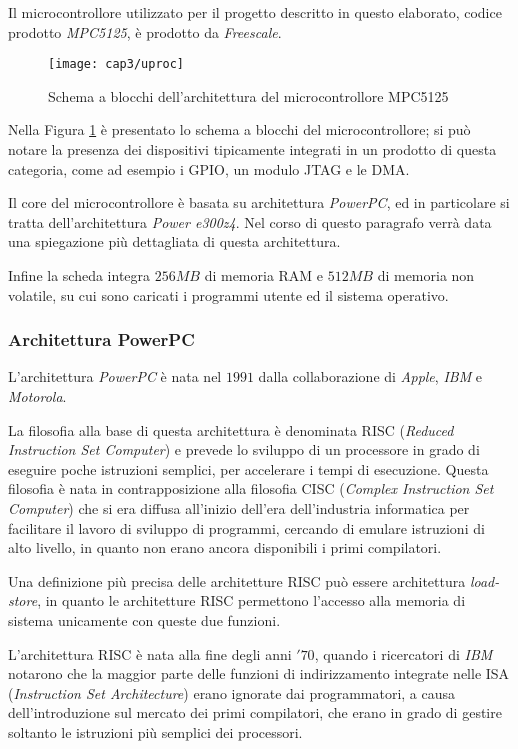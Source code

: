 Il microcontrollore utilizzato per il progetto descritto in questo elaborato, codice prodotto \textit{MPC5125}, è prodotto da \textit{Freescale}. 

\begin{figure}  
  \begin{center}
    \texttt{[image: cap3/uproc]}
    \caption{Schema a blocchi dell'architettura del microcontrollore MPC5125}
    \label{uproc}
  \end{center}
\end{figure}

Nella Figura \ref{uproc} è presentato lo schema a blocchi del microcontrollore; si può notare la presenza dei dispositivi tipicamente integrati in un prodotto di questa categoria, come ad esempio i GPIO, un modulo JTAG e le DMA.

Il core del microcontrollore è basata su architettura \textit{PowerPC}, ed in particolare si tratta dell'architettura \textit{Power e300z4}. Nel corso di questo paragrafo verrà data una spiegazione più dettagliata di questa architettura.

Infine la scheda integra $256MB$ di memoria RAM e $512MB$ di memoria non volatile, su cui sono caricati i programmi utente ed il sistema operativo.

\subsubsection{Architettura PowerPC}
L'architettura \textit{PowerPC} è nata nel $1991$ dalla collaborazione di \textit{Apple}, \textit{IBM} e \textit{Motorola}. 

La filosofia alla base di questa architettura è denominata RISC (\textit{Reduced Instruction Set Computer}) e prevede lo sviluppo di un processore in grado di eseguire poche istruzioni semplici, per accelerare i tempi di esecuzione. Questa filosofia è nata in contrapposizione alla filosofia CISC (\textit{Complex Instruction Set Computer}) che si era diffusa all'inizio dell'era dell'industria informatica per facilitare il lavoro di sviluppo di programmi, cercando di emulare istruzioni di alto livello, in quanto non erano ancora disponibili i primi compilatori.

Una definizione più precisa delle architetture RISC può essere architettura \textit{load-store}, in quanto le architetture RISC permettono l'accesso alla memoria di sistema unicamente con queste due funzioni.

L'architettura RISC è nata alla fine degli anni $'70$, quando i ricercatori di \textit{IBM} notarono che la maggior parte delle funzioni di indirizzamento integrate nelle ISA (\textit{Instruction Set Architecture}) erano ignorate dai programmatori, a causa dell'introduzione sul mercato dei primi compilatori, che erano in grado di gestire soltanto le istruzioni più semplici dei processori.

